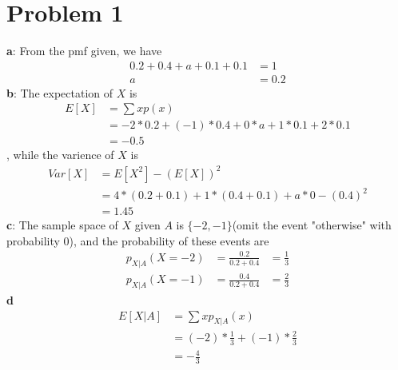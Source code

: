 \documentclass[12pt,letterpaper]{article}
\begin{document}
\section*{Problem 1}
    \textbf{a}: From the pmf given, we have
        \begin{equation*}
            \begin{aligned}
                0.2 + 0.4 + a + 0.1 + 0.1 &= 1 \\
                a &= 0.2
            \end{aligned}
        \end{equation*}
    \textbf{b}: The expectation of $X$ is
        \begin{equation*}
            \begin{aligned}
                E[X] &= \sum xp(x) \\
                &= -2 * 0.2 + (-1) * 0.4 + 0 * a + 1 * 0.1 + 2 * 0.1 \\
                &= -0.5
            \end{aligned}
        \end{equation*}
        , while the varience of $X$ is
        \begin{equation*}
            \begin{aligned}
                Var[X] &= E[X^{2}] - (E[X])^{2} \\
                &= 4 * (0.2 + 0.1) + 1 * (0.4 + 0.1) + a * 0 - (0.4)^{2} \\
                &= 1.45
            \end{aligned}
        \end{equation*}
    \textbf{c}: The sample space of $X$ given $A$ is $\{-2, -1\}$(omit the event "otherwise" with probability 0), and the probability of these events are
    \begin{equation*}
        \begin{aligned}
            p_{X | A}(X = -2) &= \frac{0.2}{0.2 + 0.4} &= \frac{1}{3} \\
            p_{X | A}(X = -1) &= \frac{0.4}{0.2 + 0.4} &= \frac{2}{3}
        \end{aligned}
    \end{equation*}
    \textbf{d}
    \begin{equation*}
        \begin{aligned}
            E[X | A] &= \sum xp_{X | A}(x) \\
            &= (-2) * \frac{1}{3} + (-1) * \frac{2}{3} \\
            &= -\frac{4}{3}
        \end{aligned}
    \end{equation*}
\end{document}

